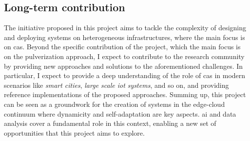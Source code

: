 \documentclass[12pt]{article}
\begin{document}
\subsection{Long-term contribution}
The initiative proposed in this project aims to tackle the complexity of designing and deploying systems on heterogeneous infrastructures,
where the main focus is on \ac{cas}.
%
Beyond the specific contribution of the project,
which the main focus is on the pulverization approach,
I expect to contribute to the research community by providing new approaches and solutions to the aforementioned challenges.
%
In particular,
I expect to provide a deep understanding of the role of \ac{cas} in modern scenarios like \emph{smart cities}, \emph{large scale \ac{iot} systems}, and so on,
and providing reference implementations of the proposed approaches.
%
Summing up,
this project can be seen as a groundwork for the creation of systems in the edge-cloud continuum where dynamicity and self-adaptation are key aspects.
%
\ac{ai} and data analysis cover a fundamental role in this context,
enabling a new set of opportunities that this project aims to explore.

\newpage

\printbibliography
\end{document}
